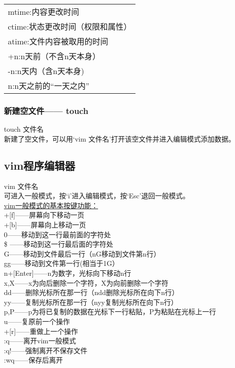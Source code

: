 \documentclass[12pt]{article}
\begin{document}
\begin{flushleft}
\begin{tabular}{|p{15cm}|}
\hline
mtime:内容更改时间\\
ctime:状态更改时间（权限和属性）\\
atime:文件内容被取用的时间\\
+n:n天前（不含n天本身）\\
-n:n天内（含n天本身)\\
n:n天之前的``一天之内”\\
\hline
\end{tabular}
\subsubsection{新建空文件——{} touch}
touch 文件名\\
新建了空文件，可以用`vim 文件名'打开该空文件并进入编辑模式添加数据。
\end{flushleft}
\subsection{vim程序编辑器}
\begin{flushleft}
vim 文件名\\
可进入一般模式，按`i'进入编辑模式，按`Esc'退回一般模式。\\
\underline{vim一般模式的基本按键功能：}\\
[Ctrl]+[f]——屏幕向下移动一页\\
[Ctrl]+[b]——屏幕向上移动一页\\
0——移动到这一行最前面的字符处\\
\${} ——移动到这一行最后面的字符处\\
G——移动到文件最后一行（nG移动到文件第n行）\\
gg——移动到文件第一行(相当于1G）\\
n+[Enter]——n为数字，光标向下移动n行\\
x,X——x为向后删除一个字符，X为向前删除一个字符\\
dd——删除光标所在那一行（ndd删除光标所在向下n行）\\
yy——复制光标所在那一行（nyy复制光标所在向下n行）\\
p,P——p为将已复制的数据在光标下一行粘贴，P为粘贴在光标上一行\\
u——复原前一个操作\\
[Ctrl]+[r]——重做上一个操作\\
:q——离开vim一般模式\\
:q!——强制离开不保存文件\\
:wq——保存后离开
\end{flushleft}
\end{document}
